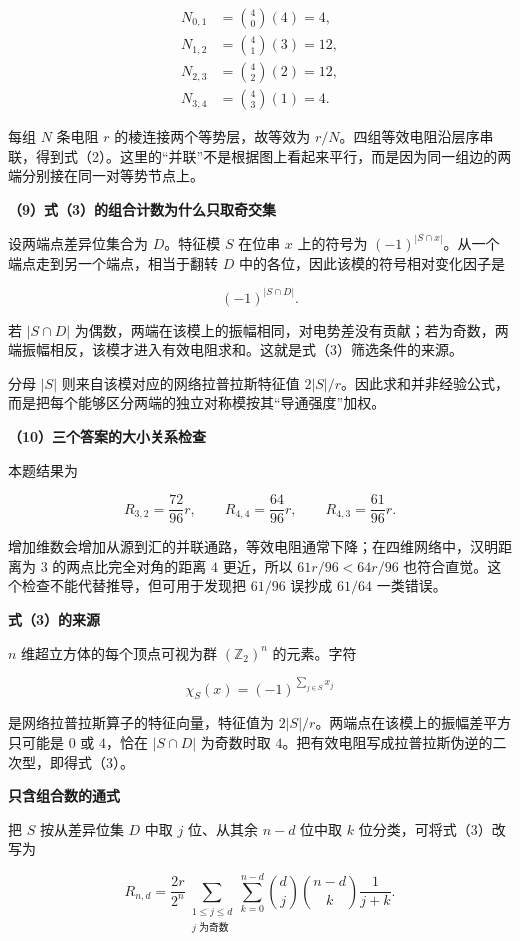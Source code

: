 \documentclass[12pt,a4paper,UTF8]{ctexart}
\begin{document}
\[
\begin{aligned}
N_{0,1}&=\binom40(4)=4,\\
N_{1,2}&=\binom41(3)=12,\\
N_{2,3}&=\binom42(2)=12,\\
N_{3,4}&=\binom43(1)=4.
\end{aligned}
\]

每组 \(N\) 条电阻 \(r\) 的棱连接两个等势层，故等效为
\(r/N\)。四组等效电阻沿层序串联，得到式（2）。这里的``并联''不是根据图上看起来平行，而是因为同一组边的两端分别接在同一对等势节点上。

\textbf{（9）式（3）的组合计数为什么只取奇交集}

设两端点差异位集合为 \(D\)。特征模 \(S\) 在位串 \(x\) 上的符号为
\((-1)^{|S\cap x|}\)。从一个端点走到另一个端点，相当于翻转 \(D\)
中的各位，因此该模的符号相对变化因子是

\[
(-1)^{|S\cap D|}.
\]

若 \(|S\cap D|\)
为偶数，两端在该模上的振幅相同，对电势差没有贡献；若为奇数，两端振幅相反，该模才进入有效电阻求和。这就是式（3）筛选条件的来源。

分母 \(|S|\) 则来自该模对应的网络拉普拉斯特征值
\(2|S|/r\)。因此求和并非经验公式，而是把每个能够区分两端的独立对称模按其``导通强度''加权。

\textbf{（10）三个答案的大小关系检查}

本题结果为

\[
R_{3,2}=\frac{72}{96}r,
\qquad
R_{4,4}=\frac{64}{96}r,
\qquad
R_{4,3}=\frac{61}{96}r.
\]

增加维数会增加从源到汇的并联通路，等效电阻通常下降；在四维网络中，汉明距离为
\(3\) 的两点比完全对角的距离 \(4\) 更近，所以 \(61r/96<64r/96\)
也符合直觉。这个检查不能代替推导，但可用于发现把 \(61/96\) 误抄成
\(61/64\) 一类错误。

\textbf{式（3）的来源}

\(n\) 维超立方体的每个顶点可视为群 \((\mathbb Z_2)^n\) 的元素。字符

\[
\chi_S(x)=(-1)^{\sum_{j\in S}x_j}
\]

是网络拉普拉斯算子的特征向量，特征值为
\(2|S|/r\)。两端点在该模上的振幅差平方只可能是 \(0\) 或 \(4\)，恰在
\(|S\cap D|\) 为奇数时取
\(4\)。把有效电阻写成拉普拉斯伪逆的二次型，即得式（3）。

\textbf{只含组合数的通式}

把 \(S\) 按从差异位集 \(D\) 中取 \(j\) 位、从其余 \(n-d\) 位中取 \(k\)
位分类，可将式（3）改写为

\[
R_{n,d}
=\frac{2r}{2^n}
\sum_{\substack{1\leq j\leq d\\j\text{ 为奇数}}}
\sum_{k=0}^{n-d}
\binom dj\binom{n-d}{k}\frac1{j+k}.
\]
\end{document}
